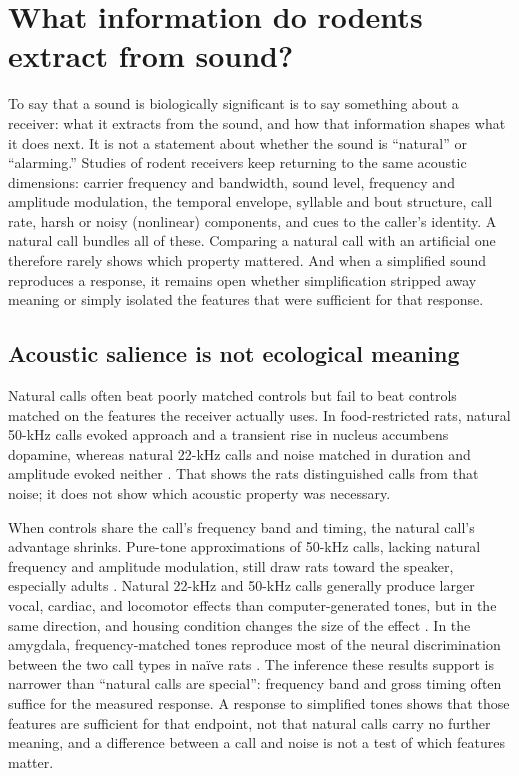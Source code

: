 \section{What information do rodents extract from sound?}
\label{sec:features}

To say that a sound is biologically significant is to say something about a receiver: what it extracts from the sound, and how that information shapes what it does next. It is not a statement about whether the sound is ``natural'' or ``alarming.'' Studies of rodent receivers keep returning to the same acoustic dimensions: carrier frequency and bandwidth, sound level, frequency and amplitude modulation, the temporal envelope, syllable and bout structure, call rate, harsh or noisy (nonlinear) components, and cues to the caller's identity. A natural call bundles all of these. Comparing a natural call with an artificial one therefore rarely shows which property mattered. And when a simplified sound reproduces a response, it remains open whether simplification stripped away meaning or simply isolated the features that were sufficient for that response.

\subsection{Acoustic salience is not ecological meaning}
\label{sec:features-salience}

Natural calls often beat poorly matched controls but fail to beat controls matched on the features the receiver actually uses. In food-restricted rats, natural 50-kHz calls evoked approach and a transient rise in nucleus accumbens dopamine, whereas natural 22-kHz calls and noise matched in duration and amplitude evoked neither \citep{WilluhnEtAl2014}. That shows the rats distinguished calls from that noise; it does not show which acoustic property was necessary.

When controls share the call's frequency band and timing, the natural call's advantage shrinks. Pure-tone approximations of 50-kHz calls, lacking natural frequency and amplitude modulation, still draw rats toward the speaker, especially adults \citep{WohrSchwarting2007}. Natural 22-kHz and 50-kHz calls generally produce larger vocal, cardiac, and locomotor effects than computer-generated tones, but in the same direction, and housing condition changes the size of the effect \citep{OlszynskiEtAl2020}. In the amygdala, frequency-matched tones reproduce most of the neural discrimination between the two call types in naïve rats \citep{ParsanaEtAl2012a}. The inference these results support is narrower than ``natural calls are special'': frequency band and gross timing often suffice for the measured response. A response to simplified tones shows that those features are sufficient for that endpoint, not that natural calls carry no further meaning, and a difference between a call and noise is not a test of which features matter.

